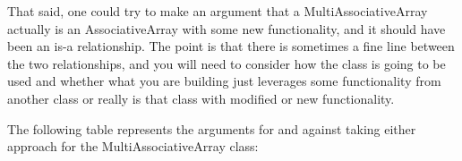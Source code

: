 That said, one could try to make an argument that a MultiAssociativeArray actually is an AssociativeArray with some new functionality, and it should have been an is-a relationship. The point is that there is sometimes a fine line between the two relationships, and you will need to consider how the class is going to be used and whether what you are building just leverages some functionality from another class or really is that class with modified or new functionality.

The following table represents the arguments for and against taking either approach for the MultiAssociativeArray class:

